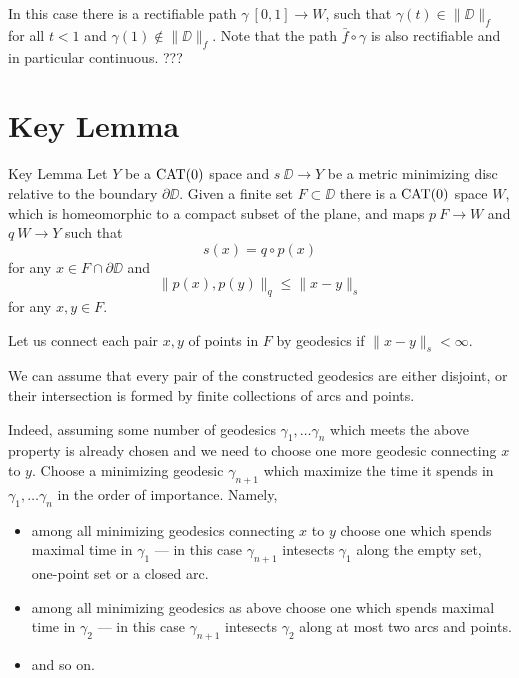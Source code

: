 \documentclass[a4paper,10pt]{amsart}
\begin{document}
In this case there is a rectifiable path $\gamma\:[0,1]\to W$,
such that $\gamma(t)\in\|\DD\|_f$ for all $t<1$ and $\gamma(1)\notin \|\DD\|_f$.
Note that the path $\bar f\circ \gamma$ is also rectifiable and in particular continuous.
???
\qeds








\section{Key Lemma}


\begin{thm}{Key Lemma}\label{lem:key}
Let $Y$ be a $\mathop{\rm CAT}\nolimits(0)$ space and $s\:\DD\to Y$ 
be a metric minimizing disc relative to the boundary $\partial \DD$.
Given a finite set $F\subset \DD$
there is a $\mathop{\rm CAT}\nolimits(0)$ space $W$, which is homeomorphic to a compact subset of the plane,
and maps $p\:F\to W$ and $q\:W\to Y$ such that
\[s(x)=q\circ p(x)\] 
for any $x\in F\cap \partial \DD$
and 
\[\|p(x),p(y)\|_q\le \|x-y\|_s\] 
for any $x,y\in F$.
\end{thm}

Let us connect each pair $x,y$ of points in $F$ by geodesics
if $\|x-y\|_s<\infty$.

We can assume that 
every pair of the constructed geodesics 
are either disjoint, or their intersection is formed by finite collections of arcs and points.

Indeed, assuming some number of geodesics $\gamma_1,\dots\gamma_n$ which meets the above property is already chosen and we need to choose one more geodesic connecting $x$ to $y$.
Choose a minimizing geodesic $\gamma_{n+1}$ which maximize the time it spends in $\gamma_1,\dots\gamma_n$  in the order of importance.
Namely, 
\begin{itemize}
\item  among all minimizing geodesics connecting $x$ to $y$
choose one which spends maximal time in $\gamma_1$ --- in this case $\gamma_{n+1}$ intesects $\gamma_1$ along the empty set, one-point set or a closed arc.
\item among all minimizing geodesics as above
choose one which spends maximal time in $\gamma_2$ --- in this case $\gamma_{n+1}$ intesects $\gamma_2$ along at most two arcs and points.
\item and so on.
\end{itemize}

\end{document}
